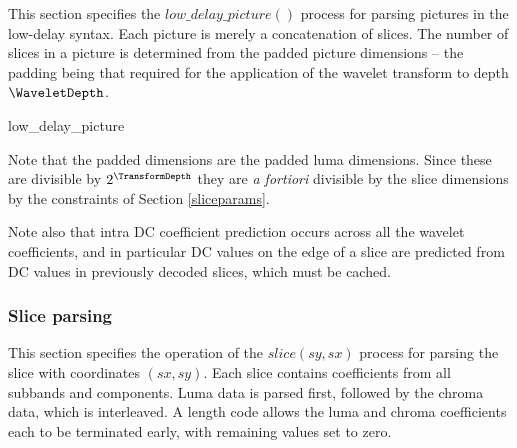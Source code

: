 This section specifies the $low\_delay\_picture()$ process for parsing pictures in the low-delay syntax. Each picture
is merely a concatenation of slices. The number of slices in a picture is determined from the padded picture dimensions
-- the padding being that required for the application of the wavelet transform to depth $\WaveletDepth$.

\begin{pseudo}{low\_delay\_picture}{}
  \bsEND
\bsEND
{}
\bsEND
\end{pseudo}

Note that the padded dimensions are the padded luma dimensions. Since these are divisible 
by $2^\TransformDepth$ they are {\em a fortiori} divisible by the slice dimensions by 
the constraints of Section \ref{sliceparams}. 

Note also that intra DC coefficient prediction
occurs across all the wavelet coefficients, and in particular DC values on the edge of a slice
are predicted from DC values in previously decoded slices, which must be cached. 

\subsubsection{Slice parsing}
\label{sliceparsing}

This section specifies the operation of the $slice(sy,sx)$ process for parsing the slice with coordinates $(sx,sy)$. Each slice
contains coefficients from all subbands and components. Luma data is parsed first, followed by the chroma data, which
is interleaved. A length code allows the luma and chroma coefficients each to be terminated early, with remaining values
set to zero.

